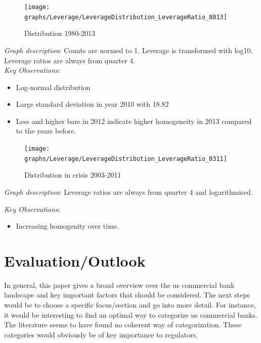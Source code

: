 \documentclass[12pt, a4paper]{article} %
\begin{document}
\begin{figure}[hbtp]
\centering
\caption{Distribution 1980-2013}
\texttt{[image: graphs/Leverage/LeverageDistribution\_LeverageRatio\_8013]}
\end{figure}

\noindent \textit{Graph description}: Counts are normed to 1. Leverage is transformed with log10. Leverage ratios are always from quarter 4.
\\

\noindent \textit{Key Observations}:
\begin{itemize}
\item Log-normal distribution
\item Large standard deviation in year 2010 with 18.82
\item Less and higher bars in 2012 indicate higher homogeneity in 2013 compared to the years before.
\end{itemize}

\pagebreak


\begin{figure}[hbtp]
\centering
\caption{Distribution in crisis 2003-2011}
\texttt{[image: graphs/Leverage/LeverageDistribution\_LeverageRatio\_0311]}
\end{figure}

\noindent \textit{Graph description}: Leverage ratios are always from quarter 4 and  logarithmised.

\noindent \textit{Key Observations}:
\begin{itemize}
\item Increasing homogenity over time.
\end{itemize}

\fi

\newpage
\section{Evaluation/Outlook}

In general, this paper gives a broad overview over the us commercial bank landscape and key important factors that should be considered. The next steps would be to choose a specific focus/section and go into more detail. For instance, it would be interesting to find an optimal way to categorize us commercial banks. The literature seems to have found no coherent way of categorization. These categories would obviously be of key importance to regulators.
\end{document}
